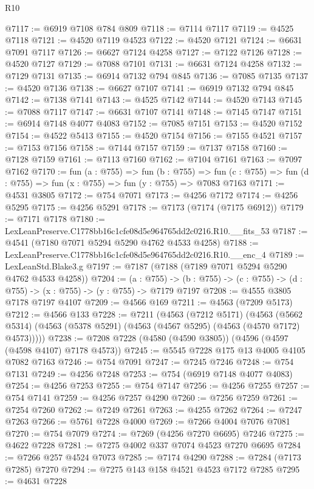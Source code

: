 \begin{lexlean}{R10}
\begin{coremodule}
@7117 := @6919 @7108 @784 @809
@7118 := @7114 @7117
@7119 := @4525 @7118
@7121 := @4520 @7119 @4523
@7122 := @4520 @7121
@7124 := @6631 @7091 @7117
@7126 := @6627 @7124 @4258
@7127 := @7122 @7126
@7128 := @4520 @7127
@7129 := @7088 @7101
@7131 := @6631 @7124 @4258
@7132 := @7129 @7131
@7135 := @6914 @7132 @794 @845
@7136 := @7085 @7135
@7137 := @4520 @7136
@7138 := @6627 @7107
@7141 := @6919 @7132 @794 @845
@7142 := @7138 @7141
@7143 := @4525 @7142
@7144 := @4520 @7143
@7145 := @7088 @7117
@7147 := @6631 @7107 @7141
@7148 := @7145 @7147
@7151 := @6914 @7148 @4077 @4083
@7152 := @7085 @7151
@7153 := @4520 @7152
@7154 := @4522 @5413
@7155 := @4520 @7154
@7156 := @7155 @4521
@7157 := @7153 @7156
@7158 := @7144 @7157
@7159 := @7137 @7158
@7160 := @7128 @7159
@7161 := @7113 @7160
@7162 := @7104 @7161
@7163 := @7097 @7162
@7170 := fun (a : @755) =>
  fun (b : @755) =>
  fun (c : @755) => fun (d : @755) => fun (x : @755) => fun (y : @755) => @7083 @7163
@7171 := @4531 @3805
@7172 := @754 @7071
@7173 := @4256 @7172
@7174 := @4256 @5295
@7175 := @4256 @5291
@7178 := @7173 (@7174 (@7175 @6912))
@7179 := @7171 @7178
@7180 := LexLeanPreserve.C1778bb16c1cfe08d5e964765dd2c0216.R10.__fits_53
@7187 := @4541 (@7180 @7071 @5294 @5290 @4762 @4533 @4258)
@7188 := LexLeanPreserve.C1778bb16c1cfe08d5e964765dd2c0216.R10.__enc_4
@7189 := LexLeanStd.Blake3.g
@7197 := @7187 (@7188 (@7189 @7071 @5294 @5290 @4762 @4533 @4258))
@7204 := (a : @755) ->
  (b : @755) -> (c : @755) -> (d : @755) -> (x : @755) -> (y : @755) -> @7179 @7197
@7208 := @4555 @3805 @7178 @7197 @4107
@7209 := @4566 @169
@7211 := @4563 (@7209 @5173)
@7212 := @4566 @133
@7228 := @7211
    (@4563
      (@7212 @5171)
      (@4563 (@5662 @5314) (@4563 (@5378 @5291) (@4563 (@4567 @5295) (@4563 (@4570 @7172) @4573)))))
@7238 := @7208 @7228 (@4580 (@4590 @3805)) (@4596 (@4597 (@4598 @4107) @7178 @4573))
@7245 := @5545 @7228 @175 @13 @4005 @4105 @7082 @7163
@7246 := @754 @7091
@7247 := @7245 @7246
@7248 := @754 @7131
@7249 := @4256 @7248
@7253 := @754 (@6919 @7148 @4077 @4083)
@7254 := @4256 @7253
@7255 := @754 @7147
@7256 := @4256 @7255
@7257 := @754 @7141
@7259 := @4256 @7257 @4290
@7260 := @7256 @7259
@7261 := @7254 @7260
@7262 := @7249 @7261
@7263 := @4255 @7262
@7264 := @7247 @7263
@7266 := @5761 @7228 @4000
@7269 := @7266 @4004 @7076 @7081
@7270 := @754 @7079
@7274 := @7269 (@4256 @7270 @6695) @7246
@7275 := @4622 @7228
@7281 := @7275 @4002 @337 @7074 @4523 @7270 @6695
@7284 := @7266 @257 @4524 @7073
@7285 := @7174 @4290
@7288 := @7284 (@7173 @7285) @7270
@7294 := @7275 @143 @158 @4521 @4523 @7172 @7285
@7295 := @4631 @7228

\end{coremodule}
\end{lexlean}
